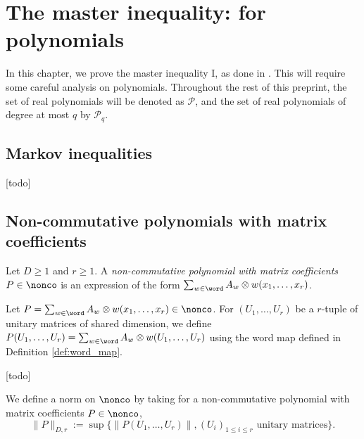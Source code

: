 \chapter{The master inequality: for polynomials}

In this chapter, we prove the master inequality I, as done in \cite[Section 6]{chen2025}.
This will require some careful analysis on polynomials.
Throughout the rest of this preprint, the set of real polynomials will be denoted as $\mathcal{P}$,
and the set of real polynomials of degree at most $q$ by $\mathcal{P}_q$.

\section{Markov inequalities}

\begin{proposition}
  \label{prop:Markov_ineq}
  [todo]
\end{proposition}

\section{Non-commutative polynomials with matrix coefficients}

\begin{definition}
  \label{def:non_comm_poly}
  Let $D \geq 1$ and $r \geq 1$.
  A \emph{non-commutative polynomial with matrix coefficients} $P \in \nonco$
  is an expression of the form $\sum_{w \in \word} A_w \otimes w(x_1, \ldots, x_{r})$.
\end{definition}

\begin{definition}
  \label{def:non_co_map}
  Let $P = \sum_{w \in \word} A_w \otimes w(x_1, \ldots, x_{r})\in \nonco$.
  For $(U_1, \ldots, U_r)$ be a $r$-tuple of unitary matrices of shared dimension,
  we define
  $P(U_1, \ldots, U_r) = \sum_{w \in \word} A_w \otimes w(U_1, \ldots, U_r)$
  using the word map defined in Definition \ref{def:word_map}.
\end{definition}

\begin{definition}
  \label{def:self_adjoint_P}
  [todo]
\end{definition}

\begin{definition}
  \label{def:norm_non_comm_poly}
  We define a norm on $\nonco$ by taking for a non-commutative polynomial
  with matrix coefficients $P \in \nonco$,
  \begin{equation*}
    \|P\|_{D,r} := \sup \{ \|P(U_1, \ldots, U_r)\|, (U_i)_{1 \leq i \leq r}
    \text{ unitary matrices}\}.
  \end{equation*}
\end{definition}

